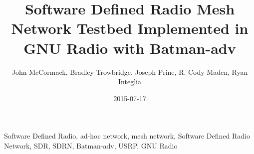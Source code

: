 \documentclass{IEEEtran}
\title{Software Defined Radio Mesh Network Testbed Implemented in GNU Radio with Batman-adv}
\date{2015-07-17}
\author{John McCormack, Bradley Trowbridge, Joseph Prine, R. Cody Maden, Ryan Integlia}
\begin{document}
\maketitle

\begin{abstract}
	
\end{abstract}
\begin{IEEEkeywords}
Software Defined Radio, ad-hoc network, mesh network, Software Defined Radio Network, SDR, SDRN, Batman-adv, USRP,
GNU Radio
\end{IEEEkeywords}











\end{document}
